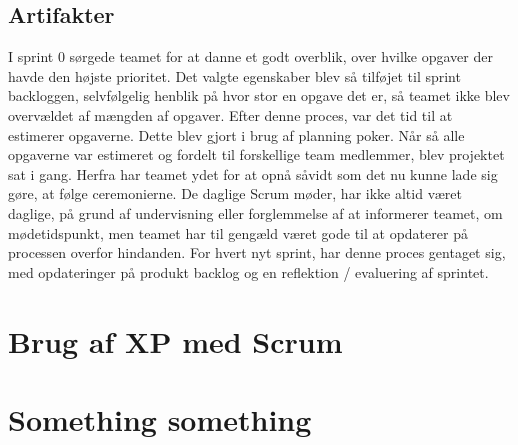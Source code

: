 \subsection{Artifakter}

I sprint 0 sørgede teamet for at danne et godt overblik, over hvilke opgaver der havde den højste prioritet. Det valgte egenskaber blev så tilføjet til sprint backloggen, selvfølgelig henblik på hvor stor en opgave det er, så teamet ikke blev overvældet af mængden af opgaver. Efter denne proces, var det tid til at estimerer opgaverne. Dette blev gjort i brug af planning poker. Når så alle opgaverne var estimeret og fordelt til forskellige team medlemmer, blev projektet sat i gang. Herfra har teamet ydet for at opnå såvidt som det nu kunne lade sig gøre, at følge ceremonierne. De daglige Scrum møder, har ikke altid været daglige, på grund af undervisning eller forglemmelse af at informerer teamet, om mødetidspunkt, men teamet har til gengæld været gode til at opdaterer på processen overfor hindanden. For hvert nyt sprint, har denne proces gentaget sig, med opdateringer på produkt backlog og en reflektion / evaluering af sprintet. 



\section{Brug af XP med Scrum}



\section{Something something}